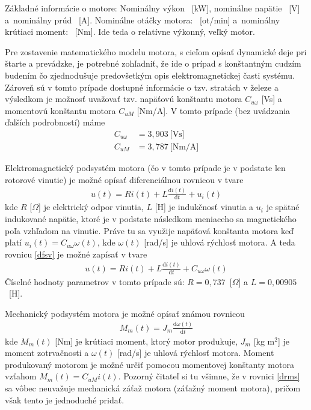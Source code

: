 \documentclass[a4paper, 10pt, ]{article}
\begin{document}
Základné informácie o motore: Nominálny výkon ~[kW], nominálne napätie ~[V] a~nominálny prúd ~[A]. Nominálne otáčky motora: ~[ot/min] a~nominálny krútiaci moment: ~[Nm]. Ide teda o relatívne výkonný, veľký motor.

Pre zostavenie matematického modelu motora, s cieľom opísať dynamické deje pri štarte a prevádzke, je potrebné zohľadniť, že ide o prípad s konštantným cudzím budením čo zjednodušuje predovšetkým opis elektromagnetickej časti systému. Zároveň sú v tomto prípade dostupné informácie o tzv. stratách v železe a výsledkom je možnosť uvažovať tzv. napäťovú konštantu motora $C_{u\omega}$ [Vs] a momentovú konštantu motora $C_{uM}$ [Nm/A]. V tomto prípade (bez uvádzania ďalších podrobností) máme
\begin{subequations}
	\begin{align}
		C_{u\omega} &= 3,903\ \text{[Vs]}\\
		C_{uM} &= 3,787\ \text{[Nm/A]}
	\end{align}
\end{subequations}


Elektromagnetický podsystém motora (čo v tomto prípade je v podstate len rotorové vinutie) je možné opísať diferenciálnou rovnicou v tvare
\begin{align} \label{dfsv}
	u(t) = R i(t) + L \frac{\text{d}i(t)}{\text{d}t} + u_i(t)
\end{align}
kde $R$ [$\Omega$] je elektrický odpor vinutia, $L$ [H] je indukčnosť vinutia a $u_i$ je spätné indukované napätie, ktoré je v podstate následkom meniaceho sa magnetického poľa vzhľadom na vinutie. Práve tu sa využije napäťová konštanta motora keď platí $u_i(t) = C_{u\omega} \omega(t)$, kde $\omega(t)$ [rad/s] je uhlová rýchlosť motora. A teda rovnicu \eqref{dfsv} je možné zapísať v tvare
\begin{align} \label{dfsv2}
	u(t) = R i(t) + L \frac{\text{d}i(t)}{\text{d}t} + C_{u\omega} \omega(t)
\end{align}
Číselné hodnoty parametrov v tomto prípade sú: $R = 0,737$~[$\Omega$] a $L = 0,00905$~[H].



Mechanický podsystém motora je možné opísať známou rovnicou
\begin{align} \label{drms}
	M_m(t) = J_m \frac{\text{d}\omega(t)}{\text{d}t}
\end{align}
kde $M_m(t)$ [Nm] je krútiaci moment, ktorý motor produkuje, $J_m$ [kg m${}^2$] je moment zotrvačnosti a $\omega(t)$ [rad/s] je uhlová rýchlosť motora. Moment produkovaný motorom je možné určiť pomocou momentovej konštanty motora vzťahom $M_m(t) = C_{uM} i(t)$. Pozorný čitateľ si tu všimne, že v rovnici \eqref{drms} sa vôbec neuvažuje mechanická záťaž motora (záťažný moment motora), pričom však tento je jednoduché pridať.
\end{document}
